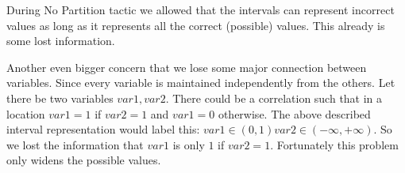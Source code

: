 During No Partition tactic we allowed that the intervals can represent incorrect values as long as it represents all the correct (possible) values. This already is some lost information.

Another even bigger concern that we lose some major connection between variables. Since every variable is maintained independently from the others. Let there be two variables $var1, var2$. There could be a correlation such that in a location $var1=1$ if $var2=1$ and $var1=0$ otherwise. The above described interval representation would label this: $var1 \in (0, 1) var2 \in (-\infty, +\infty)$. So we lost the information that $var1$ is only $1$ if $var2=1$. Fortunately this problem only widens the possible values.